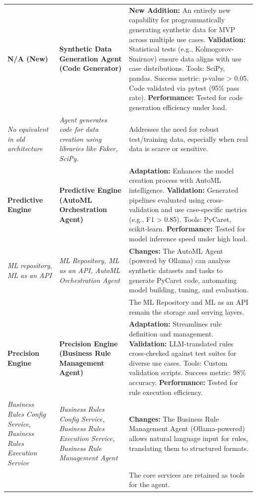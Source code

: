\documentclass{article}
\begin{document}
\begin{longtable}{|p{4cm}|p{6cm}|p{6cm}|}
    \textbf{N/A (New)} & \textbf{Synthetic Data Generation Agent (Code Generator)} & \textbf{New Addition:} An entirely new capability for programmatically generating synthetic data for MVP across multiple use cases. \textbf{Validation:} Statistical tests (e.g., Kolmogorov-Smirnov) ensure data aligns with use case distributions. Tools: SciPy, pandas. Success metric: p-value > 0.05. Code validated via pytest (95\% pass rate). \textbf{Performance:} Tested for code generation efficiency under load. \\
    \textit{No equivalent in old architecture} & \textit{Agent generates code for data creation using libraries like Faker, SciPy.} & Addresses the need for robust test/training data, especially when real data is scarce or sensitive. \\
    \hline

    \textbf{Predictive Engine} & \textbf{Predictive Engine (AutoML Orchestration Agent)} & \textbf{Adaptation:} Enhances the model creation process with AutoML intelligence. \textbf{Validation:} Generated pipelines evaluated using cross-validation and use case-specific metrics (e.g., F1 > 0.85). Tools: PyCaret, scikit-learn. \textbf{Performance:} Tested for model inference speed under high load. \\
    \textit{ML repository, ML as an API} & \textit{ML Repository, ML as an API, AutoML Orchestration Agent} & \textbf{Changes:} The AutoML Agent (powered by Ollama) can analyse synthetic datasets and tasks to generate PyCaret code, automating model building, tuning, and evaluation. \\
    & & The ML Repository and ML as an API remain the storage and serving layers. \\
    \hline

    \textbf{Precision Engine} & \textbf{Precision Engine (Business Rule Management Agent)} & \textbf{Adaptation:} Streamlines rule definition and management. \textbf{Validation:} LLM-translated rules cross-checked against test suites for diverse use cases. Tools: Custom validation scripts. Success metric: 98\% accuracy. \textbf{Performance:} Tested for rule execution efficiency. \\
    \textit{Business Rules Config Service, Business Rules Execution Service} & \textit{Business Rules Config Service, Business Rules Execution Service, Business Rule Management Agent} & \textbf{Changes:} The Business Rule Management Agent (Ollama-powered) allows natural language input for rules, translating them to structured formats. \\
    & & The core services are retained as tools for the agent. \\
    \hline


\end{longtable}
\end{document}
